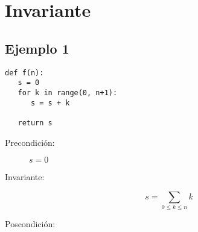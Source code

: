\section*{Invariante}

\subsection*{Ejemplo 1}
\begin{verbatim}
def f(n):
   s = 0
   for k in range(0, n+1):
      s = s + k	
   
   return s
\end{verbatim}

\begin{description}
\item[Precondición:] $s=0$
\item[Invariante: ]  $$s=\sum_{0\leq k\leq n}{k}$$
\item[Poscondición:]
\end{description}
